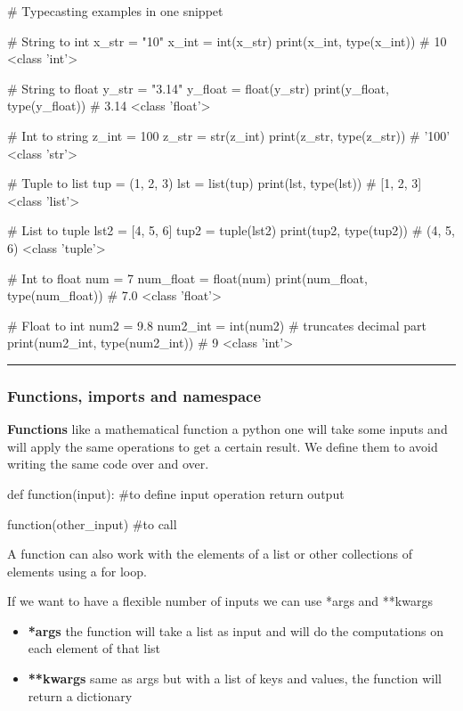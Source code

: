 \begin{pythoncode}
    # Typecasting examples in one snippet

# String to int
x_str = "10"
x_int = int(x_str)
print(x_int, type(x_int))  # 10 <class 'int'>

# String to float
y_str = "3.14"
y_float = float(y_str)
print(y_float, type(y_float))  # 3.14 <class 'float'>

# Int to string
z_int = 100
z_str = str(z_int)
print(z_str, type(z_str))  # '100' <class 'str'>

# Tuple to list
tup = (1, 2, 3)
lst = list(tup)
print(lst, type(lst))  # [1, 2, 3] <class 'list'>

# List to tuple
lst2 = [4, 5, 6]
tup2 = tuple(lst2)
print(tup2, type(tup2))  # (4, 5, 6) <class 'tuple'>

# Int to float
num = 7
num_float = float(num)
print(num_float, type(num_float))  # 7.0 <class 'float'>

# Float to int
num2 = 9.8
num2_int = int(num2)  # truncates decimal part
print(num2_int, type(num2_int))  # 9 <class 'int'>

\end{pythoncode}

\hrule

\subsubsection{Functions, imports and namespace}

\textbf{Functions} \ra like a mathematical function a python one will take some inputs and will apply the same operations to get a certain result. We define them to avoid writing the same code over and over.

\begin{pythoncode}
    def function(input): #to define
        input operation
        return output

    function(other_input) #to call
\end{pythoncode}

\vspace{10pt}

A function can also work with the elements of a list or other collections of elements using a for loop.

\vspace{10pt}

If we want to have a flexible number of inputs we can use *args and **kwargs

\begin{itemize}
    \item \textbf{*args} \ra the function will take a list as input and will do the computations on each element of that list
    \item \textbf{**kwargs} \ra same as args but with a list of keys and values, the function will return a dictionary
\end{itemize}

